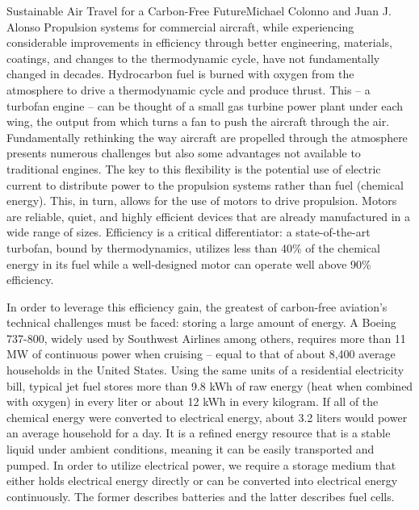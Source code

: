 \documentclass[10pt]{papertex}
\begin{document}
\begin{news}{2}{Sustainable Air Travel for a Carbon-Free Future}{Michael Colonno and Juan J. Alonso}{}{}
Propulsion systems for commercial aircraft, while experiencing considerable 
improvements in efficiency through better engineering, materials, coatings, 
and changes to the thermodynamic cycle, have not fundamentally changed in 
decades. Hydrocarbon fuel is burned with oxygen from the atmosphere to drive 
a thermodynamic cycle and produce thrust. This – a turbofan engine – can be 
thought of a small gas turbine power plant under each wing, the output from 
which turns a fan to push the aircraft through the air. Fundamentally 
rethinking the way aircraft are propelled through the atmosphere presents 
numerous challenges but also some advantages not available to traditional 
engines. The key to this flexibility is the potential use of electric current 
to distribute power to the propulsion systems rather than fuel (chemical 
energy). This, in turn, allows for the use of motors to drive propulsion. 
Motors are reliable, quiet, and highly efficient devices that are already 
manufactured in a wide range of sizes. Efficiency is a critical differentiator: 
a state-of-the-art turbofan, bound by thermodynamics, utilizes less than 40\% 
of the chemical energy in its fuel while a well-designed motor can operate 
well above 90\% efficiency.

In order to leverage this efficiency gain, the greatest of carbon-free 
aviation’s technical challenges must be faced: storing a large amount of 
energy. A Boeing 737-800, widely used by Southwest Airlines among others, 
requires more than 11 MW of continuous power when cruising – equal to that 
of about 8,400 average households in the United States. Using the same units 
of a residential electricity bill, typical jet fuel stores more than 9.8 kWh 
of raw energy (heat when combined with oxygen) in every liter or about 12 kWh 
in every kilogram. If all of the chemical energy were converted to electrical 
energy, about 3.2 liters would power an average household for a day. It is a 
refined energy resource that is a stable liquid under ambient conditions, 
meaning it can be easily transported and pumped. In order to utilize 
electrical power, we require a storage medium that either holds electrical 
energy directly or can be converted into electrical energy continuously. The 
former describes batteries and the latter describes fuel cells.



\end{news}
\end{document}
